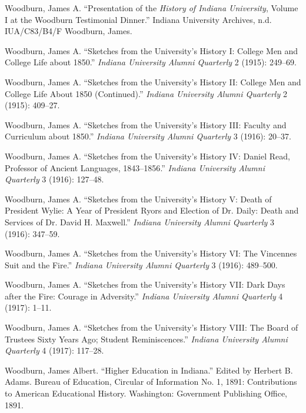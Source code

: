 \documentclass[
  american,
  letterpaper,
]{scrreprt}
\newlength{\cslhangindent}
\newenvironment{CSLReferences}[2] %
 {\begin{list}{}{%
  \setlength{\itemindent}{0pt}
  \setlength{\leftmargin}{0pt}
  \setlength{\parsep}{0pt}
  \ifodd #1
   \setlength{\leftmargin}{\cslhangindent}
   \setlength{\itemindent}{-1\cslhangindent}
  \fi
  \setlength{\itemsep}{#2\baselineskip}}}
 {\end{list}}
\begin{document}
\begin{CSLReferences}{1}{0}
Woodburn, James A. {``Presentation of the \emph{History of Indiana
University}, Volume {I} at the Woodburn Testimonial Dinner.''} Indiana
University Archives, n.d. IUA/C83/B4/F Woodburn, James.

Woodburn, James A. {``{Sketches from the University's History I: College
Men and College Life about 1850}.''} \emph{Indiana University Alumni
Quarterly} 2 (1915): 249--69.

Woodburn, James A. {``{Sketches from the University's History II:
College Men and College Life About 1850 (Continued)}.''} \emph{Indiana
University Alumni Quarterly} 2 (1915): 409--27.

Woodburn, James A. {``{Sketches from the University's History III:
Faculty and Curriculum about 1850}.''} \emph{Indiana University Alumni
Quarterly} 3 (1916): 20--37.

Woodburn, James A. {``{Sketches from the University's History IV: Daniel
Read, Professor of Ancient Languages, 1843--1856}.''} \emph{Indiana
University Alumni Quarterly} 3 (1916): 127--48.

Woodburn, James A. {``{Sketches from the University's History V: Death
of President Wylie: A Year of President Ryors and Election of Dr. Daily:
Death and Services of Dr. David H. Maxwell}.''} \emph{Indiana University
Alumni Quarterly} 3 (1916): 347--59.

Woodburn, James A. {``{Sketches from the University's History VI: The
Vincennes Suit and the Fire}.''} \emph{Indiana University Alumni
Quarterly} 3 (1916): 489--500.

Woodburn, James A. {``{Sketches from the University's History VII: Dark
Days after the Fire: Courage in Adversity}.''} \emph{Indiana University
Alumni Quarterly} 4 (1917): 1--11.

Woodburn, James A. {``{Sketches from the University's History VIII: The
Board of Trustees Sixty Years Ago; Student Reminiscences}.''}
\emph{Indiana University Alumni Quarterly} 4 (1917): 117--28.

Woodburn, James Albert. {``Higher Education in Indiana.''} Edited by
Herbert B. Adams. Bureau of Education, Circular of Information No. 1,
1891: Contributions to American Educational History. Washington:
Government Publishing Office, 1891.


\end{CSLReferences}
\end{document}
